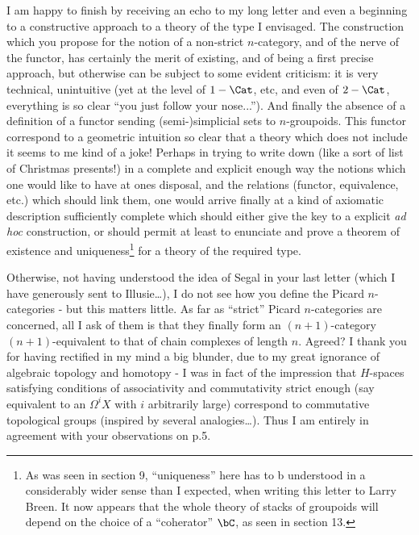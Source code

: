 \label{sec:app9}%
I am happy to finish by receiving an echo to my long letter and even a beginning to a constructive approach to a theory of the type I envisaged. The construction which you propose for the notion of a non-strict $n$-category, and of the nerve of the functor, has certainly the merit of existing, and of being a first precise approach, but otherwise can be subject to some evident criticism: it is very technical, unintuitive (yet at the level of $1-\Cat$, etc, and even of $2-\Cat$, everything is so clear ``you just follow your nose...''). And finally the absence of a definition of a functor sending (semi-)simplicial sets to $n$-groupoids. This functor correspond to a geometric intuition so clear that a theory which does not include it seems to me kind of a joke! Perhaps in trying to write down (like a sort of list of Christmas presents!) in a complete and explicit enough way the notions which one would like to have at ones disposal, and the relations (functor, equivalence, etc.) which should link them, one would arrive finally at a kind of axiomatic description sufficiently complete which should either give the key to a explicit \emph{ad hoc} construction, or should permit at least to enunciate and prove a theorem of existence and uniqueness\footnote{As was seen in section 9, ``uniqueness'' here has to b understood in a considerably wider sense than I expected, when writing this letter to Larry Breen. It now appears that the whole theory of stacks of groupoids will depend on the choice of a ``coherator'' $\bC$, as seen in section 13.} for a theory of the required type.

Otherwise, not having understood the idea of Segal in your last letter (which I have generously sent to Illusie\dots), I do not see how you define the Picard $n$-categories - but this matters little. As far as ``strict'' Picard $n$-categories are concerned, all I ask of them is that they finally form an $(n + 1)$-category $(n + 1)$-equivalent to that of chain complexes of length $n$. Agreed? I thank you for having rectified in my mind a big blunder, due to my great ignorance of algebraic topology and homotopy - I was in fact of the impression that $H$-spaces satisfying conditions of associativity and commutativity strict enough (say equivalent to an $\Omega^i X$ with $i$ arbitrarily large) correspond to commutative topological groups (inspired by several analogies\dots). Thus I am entirely in agreement with your observations on p.5.

